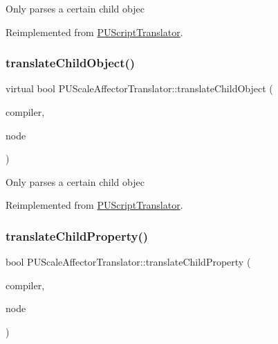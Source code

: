 Only parses a certain child objec 

Reimplemented from \hyperlink{classPUScriptTranslator_ab587d01348ae3e678cb700c719b2b113}{P\+U\+Script\+Translator}.

\mbox{\label{classPUScaleAffectorTranslator_a56754b9b1ebef5d08894ddb2f590a0e9}} 
\subsubsection{\texorpdfstring{translate\+Child\+Object()}{translateChildObject()}\hspace{0.1cm}{\footnotesize\ttfamily [2/2]}}
{\footnotesize\ttfamily virtual bool P\+U\+Scale\+Affector\+Translator\+::translate\+Child\+Object (\begin{DoxyParamCaption}\item[{\hyperlink{classPUScriptCompiler}{P\+U\+Script\+Compiler} $\ast$}]{compiler,  }\item[{\hyperlink{classPUAbstractNode}{P\+U\+Abstract\+Node} $\ast$}]{node }\end{DoxyParamCaption})\hspace{0.3cm}{\ttfamily [virtual]}}

Only parses a certain child objec 

Reimplemented from \hyperlink{classPUScriptTranslator_ab587d01348ae3e678cb700c719b2b113}{P\+U\+Script\+Translator}.

\mbox{\label{classPUScaleAffectorTranslator_a03225e1708f212e88b876e6bc43ee367}} 
\subsubsection{\texorpdfstring{translate\+Child\+Property()}{translateChildProperty()}\hspace{0.1cm}{\footnotesize\ttfamily [1/2]}}
{\footnotesize\ttfamily bool P\+U\+Scale\+Affector\+Translator\+::translate\+Child\+Property (\begin{DoxyParamCaption}\item[{\hyperlink{classPUScriptCompiler}{P\+U\+Script\+Compiler} $\ast$}]{compiler,  }\item[{\hyperlink{classPUAbstractNode}{P\+U\+Abstract\+Node} $\ast$}]{node }\end{DoxyParamCaption})\hspace{0.3cm}{\ttfamily [virtual]}}

